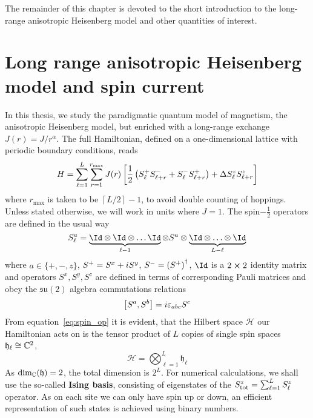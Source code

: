 The remainder of this chapter is devoted to the short introduction to the long-range anisotropic Heisenberg model
and other quantities of interest.

\section{Long range anisotropic Heisenberg model and spin current}

In this thesis, we study the paradigmatic quantum model of magnetism, the anisotropic Heisenberg
model, but enriched with a long-range exchange \(J(r) = J/r^{\alpha}\). The full Hamiltonian,
defined on a one-dimensional lattice with periodic boundary conditions, reads
\begin{equation}
    H = \sum_{\ell=1}^{L}\sum_{r=1}^{r_{\mathrm{max}}} J(r) \left[\frac{1}{2} \left(
        S^{+}_{\ell}S^{-}_{\ell+r} + S^{-}_{\ell}S^{+}_{\ell+r}\right) + \Delta S^{z}_{\ell}S^{z}_{\ell+r}
        \right]
    \label{eq:long_range}
\end{equation}
where \(r_{\mathrm{max}}\) is taken to be \(\left\lceil L/2\right\rceil - 1 \), to avoid double counting of hoppings.
Unless stated otherwise, we will work in units where \(J = 1\).
The spin\(-\frac{1}{2}\) operators are defined in the usual way
\begin{equation}
    S_{\ell}^{a} = \underbrace{\Id \otimes \Id \otimes \ldots \Id}_{\ell-1} \otimes S^{a} \otimes \underbrace{\Id \otimes \ldots \otimes \Id}_{L-\ell}
    \label{eq:spin_op}
\end{equation}
where \(a\in\{+,-,z\}\), \(S^{+} = S^x + i S^y\), \(S^{-} = \left(S^{+}\right)^{\dagger}\),
\(\Id\) is a \(2\cross 2\) identity matrix and operators \(S^x,S^y,S^z\) are defined in terms
of corresponding Pauli matrices and obey the \(\mathfrak{su}(2)\) algebra commutations relations
\begin{equation}
    \comm{S^a}{S^b} = i \varepsilon_{abc} S^c
\end{equation}
From equation~\eqref{eq:spin_op} it is evident, that the Hilbert space \(\mathcal{H}\) our Hamiltonian acts on
is the tensor product of \(L\) copies of single spin spaces \(\mathfrak{h}_{\ell} \cong \mathbb{C}^2\),
\begin{equation}
    \mathcal{H} = \bigotimes_{\ell=1}^{L} \mathfrak{h}_{\ell}
\end{equation}
As \(\mathrm{dim_{\mathbb{C}}}(\mathfrak{h}) = 2\), the total dimension is \(2^L\).
For numerical calculations, we shall use the so-called \textbf{Ising basis}, consisting of eigenstates
of the \(S^z_{\mathrm{tot}} = \sum_{\ell=1}^{L} S^{z}_{\ell}\) operator. As on each site we can only
have spin up or down, an efficient representation of such states is achieved using binary numbers.

